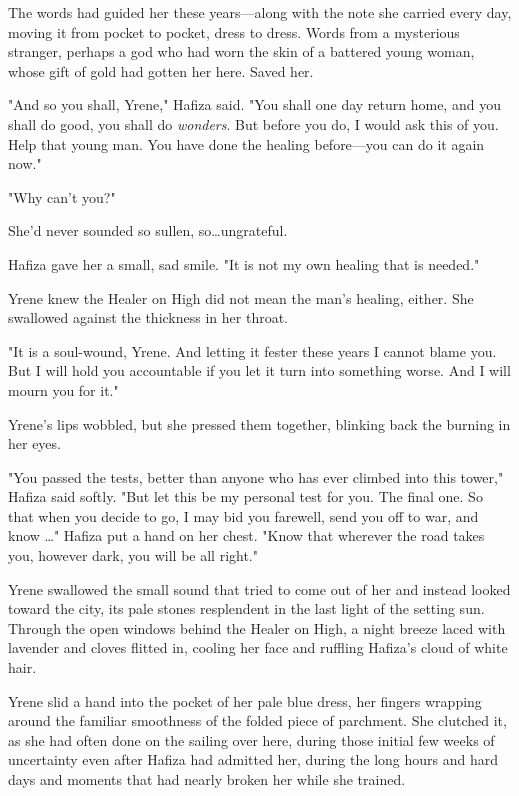 The words had guided her these years---along with the note she carried every day, moving it from pocket to pocket, dress to dress.
Words from a mysterious stranger, perhaps a god who had worn the skin of a battered young woman, whose gift of gold had gotten her here.
Saved her.

"And so you shall, Yrene," Hafiza said.
"You shall one day return home, and you shall do good, you shall do \emph{wonders}.
But before you do, I would ask this of you.
Help that young man.
You have done the healing before---you can do it again now."

"Why can't you?"

She'd never sounded so sullen, so\ldots ungrateful.

Hafiza gave her a small, sad smile.
"It is not my own healing that is needed."

Yrene knew the Healer on High did not mean the man's healing, either.
She swallowed against the thickness in her throat.

"It is a soul-wound, Yrene.
And letting it fester these years I cannot blame you.
But I will hold you accountable if you let it turn into something worse.
And I will mourn you for it."

Yrene's lips wobbled, but she pressed them together, blinking back the burning in her eyes.

"You passed the tests, better than anyone who has ever climbed into this tower," Hafiza said softly.
"But let this be my personal test for you.
The final one.
So that when you decide to go, I may bid you farewell, send you off to war, and know \ldots" Hafiza put a hand on her chest.
"Know that wherever the road takes you, however dark, you will be all right."

Yrene swallowed the small sound that tried to come out of her and instead looked toward the city, its pale stones resplendent in the last light of the setting sun.
Through the open windows behind the Healer on High, a night breeze laced with lavender and cloves flitted in, cooling her face and ruffling Hafiza's cloud of white hair.

Yrene slid a hand into the pocket of her pale blue dress, her fingers wrapping around the familiar smoothness of the folded piece of parchment.
She clutched it, as she had often done on the sailing over here, during those initial few weeks of uncertainty even after Hafiza had admitted her, during the long hours and hard days and moments that had nearly broken her while she trained.

